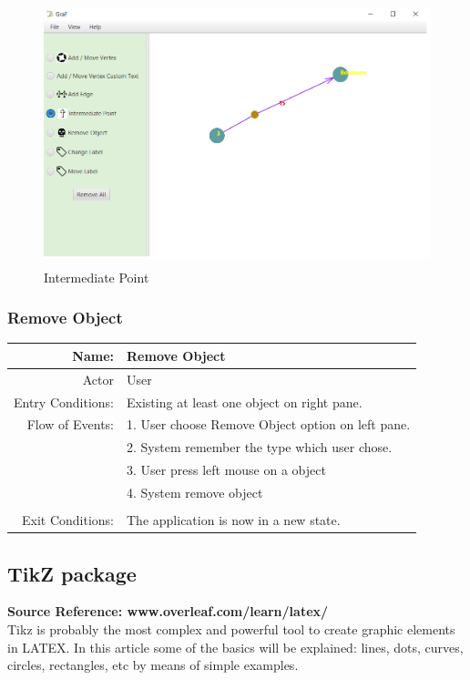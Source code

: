 \documentclass[a4paper,10pt]{article}
\begin{document}
\begin{figure}[H]
		\centering
		\includegraphics[height = 3in]{IntermediatePoint.png}
		\caption[Optional caption]{Intermediate Point}
		\label{fig:Repository}
	\end{figure}
\paragraph{}

\subsubsection{Remove Object}
	\begin{tabular}{|r|l|}
\hline
Name: & Remove Object \\
\hline
Actor & User \\
\hline
Entry Conditions: & Existing at least one object on right pane. \\
\hline
Flow of Events: & 1. User choose Remove Object option on left pane. \\
& 2. System remember the type which user chose.  \\
& 3. User press left mouse on a object  \\
& 4. System remove object  \\
\\
\hline
Exit Conditions: & The application is now in a new state. \\
\hline

\end{tabular}
	\paragraph{}
\subsection{TikZ package} 
\textbf{Source Reference: www.overleaf.com/learn/latex/} \\
Tikz is probably the most complex and powerful tool to create graphic elements in LATEX. In this article some of the basics will be explained: lines, dots, curves, circles, rectangles, etc by means of simple examples.
\end{document}
